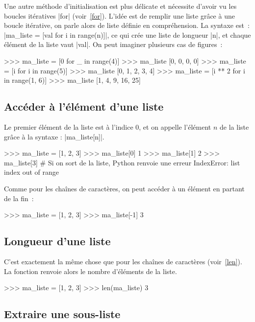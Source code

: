 		Une autre méthode d'initialisation est plus délicate et nécessite d'avoir vu les boucles itératives \python|for| (voir~\ref{for}).
		L'idée est de remplir une liste grâce à une boucle itérative, on parle alors de liste définie en compréhension. La syntaxe est~: \python|ma_liste = [val for i in range(n)]|, ce qui crée une liste de longueur \python|n|, et chaque élément de la liste vaut \python|val|.
		On peut imaginer plusieurs cas de figures~:
		
		\begin{pythoncode}
			>>> ma_liste = [0 for _ in range(4)]
			>>> ma_liste
			[0, 0, 0, 0]
			>>> ma_liste = [i for i in range(5)]
			>>> ma_liste
			[0, 1, 2, 3, 4]
			>>> ma_liste = [i ** 2 for i in range(1, 6)]
			>>> ma_liste
			[1, 4, 9, 16, 25]
		\end{pythoncode}
		
	\subsection{Accéder à l'élément d'une liste}
		
		Le premier élément de la liste est à l'indice 0, et on appelle l'élément $n$ de la liste grâce à la syntaxe : \python|ma_liste[n]|.
		\begin{pythoncode}
			>>> ma_liste = [1, 2, 3]
			>>> ma_liste[0]
			1
			>>> ma_liste[1]
			2
			>>> ma_liste[3] # Si on sort de la liste, Python renvoie une erreur
			IndexError: list index out of range
		\end{pythoncode}
		
		Comme pour les chaînes de caractères, on peut accéder à un élément en partant de la fin~:
		\begin{pythoncode}
			>>> ma_liste = [1, 2, 3]
			>>> ma_liste[-1]
			3
		\end{pythoncode}
	
	\subsection{Longueur d'une liste}
		
		C'est exactement la même chose que pour les chaînes de caractères (voir~\ref{len}). La fonction renvoie alors le nombre d'éléments de la liste.
		
		\begin{pythoncode}
			>>> ma_liste = [1, 2, 3]
			>>> len(ma_liste)
			3
		\end{pythoncode}
	
	\subsection{Extraire une sous-liste} \label{slicing}
		
